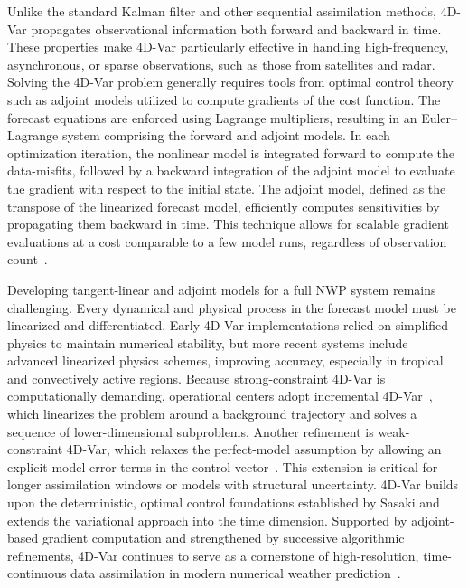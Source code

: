\documentclass[final,1p,times]{elsarticle}
\begin{document}
Unlike the standard Kalman filter and other sequential assimilation methods, 4D-Var propagates observational information both forward and backward in time. 
These properties make 4D-Var particularly effective in handling high-frequency, asynchronous, or sparse observations, such as those from satellites and radar. 
Solving the 4D-Var problem generally requires tools from optimal control theory such as adjoint models utilized to compute gradients of the cost function. 
The forecast equations are enforced using Lagrange multipliers, resulting in an Euler–Lagrange system comprising the forward and adjoint models. 
In each optimization iteration, the nonlinear model is integrated forward to compute the data-misfits, followed by a backward integration of the adjoint model to evaluate the gradient with respect to the initial state. 
The adjoint model, defined as the transpose of the linearized forecast model, efficiently computes sensitivities by propagating them backward in time. 
This technique allows for scalable gradient evaluations at a cost comparable to a few model runs, regardless of observation count~\citep{Courtier1987}. 

Developing tangent-linear and adjoint models for a full NWP system remains challenging. 
Every dynamical and physical process in the forecast model must be linearized and differentiated. 
Early 4D-Var implementations relied on simplified physics to maintain numerical stability, but more recent systems include advanced linearized physics schemes, improving accuracy, especially in tropical and convectively active regions. 
Because strong-constraint 4D-Var is computationally demanding, operational centers adopt incremental 4D-Var~\citep{Courtier1994}, which linearizes the problem around a background trajectory and solves a sequence of lower-dimensional subproblems. 
Another refinement is weak-constraint 4D-Var, which relaxes the perfect-model assumption by allowing an explicit model error terms in the control vector~\citep{Lewis1985}. 
This extension is critical for longer assimilation windows or models with structural uncertainty. 
4D-Var builds upon the deterministic, optimal control foundations established by Sasaki and extends the variational approach into the time dimension. 
Supported by adjoint-based gradient computation and strengthened by successive algorithmic refinements, 4D-Var continues to serve as a cornerstone of high-resolution, time-continuous data assimilation in modern numerical weather prediction~\citep{Gustafsson2012,Rabier2000}.
\end{document}
